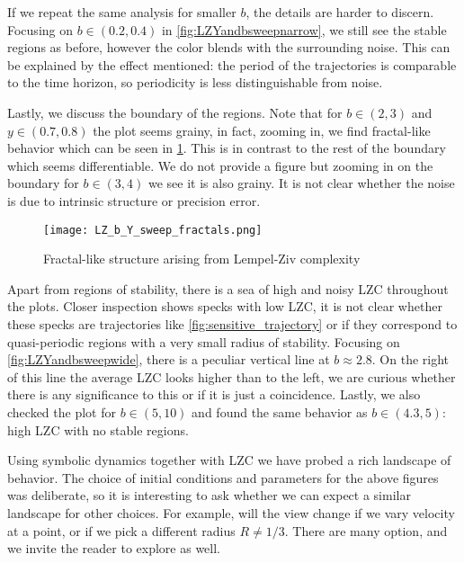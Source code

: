 If we repeat the same analysis for smaller $b$, the details are harder to discern. Focusing on $b\in(0.2,0.4)$ in \cref{fig:LZYandbsweepnarrow}, we still see the stable regions as before, however the color blends with the surrounding noise. This can be explained by the effect mentioned: the period of the trajectories is comparable to the time horizon, so periodicity is less distinguishable from noise.

Lastly, we discuss the boundary of the regions. Note that for $b\in(2,3)$ and $y\in(0.7, 0.8)$ the plot seems grainy, in fact, zooming in, we find fractal-like behavior which can be seen in \cref{fig:LZYandbsweepfractal}. This is in contrast to the rest of the boundary which seems differentiable. We do not provide a figure but zooming in on the boundary for $b\in (3,4)$ we see it is also grainy. It is not clear whether the noise is due to intrinsic structure or precision error.

\begin{figure}[!th]
\centering
\texttt{[image: LZ\_b\_Y\_sweep\_fractals.png]}
\caption{Fractal-like structure arising from Lempel-Ziv complexity}
\label{fig:LZYandbsweepfractal}
\end{figure}

Apart from regions of stability, there is a sea of high and noisy LZC throughout the plots. Closer inspection shows specks with low LZC, it is not clear whether these specks are trajectories like \cref{fig:sensitive_trajectory} or if they correspond to quasi-periodic regions with a very small radius of stability. Focusing on \cref{fig:LZYandbsweepwide}, there is a peculiar vertical line at $b\approx2.8$. On the right of this line the average LZC looks higher than to the left, we are curious whether there is any significance to this or if it is just a coincidence. Lastly, we also checked the plot for $b\in(5,10)$ and found the same behavior as $b\in(4.3, 5)$: high LZC with no stable regions.

Using symbolic dynamics together with LZC we have probed a rich landscape of behavior. The choice of initial conditions and parameters for the above figures was deliberate, so it is interesting to ask whether we can expect a similar landscape for other choices. For example, will the view change if we vary velocity at a point, or if we pick a different radius $R\neq1/3$. There are many option, and we invite the reader to explore as well.